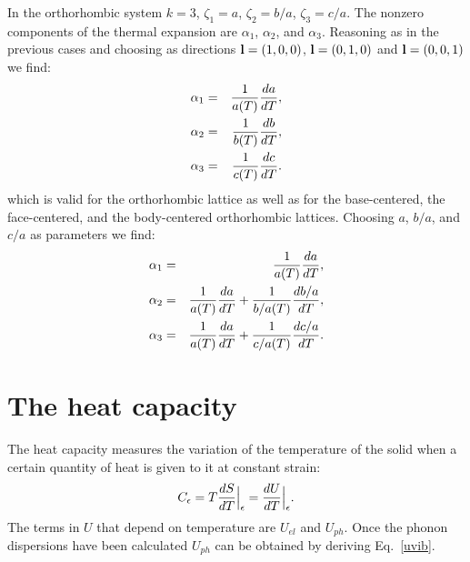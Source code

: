 \documentclass[12pt,a4paper,twoside]{report}
\begin{document}
In the orthorhombic system $k=3$, $\zeta_1=a$, $\zeta_2=b/a$, 
$\zeta_3=c/a$. The nonzero components of the thermal expansion are 
$\alpha_{1}$, $\alpha_{2}$, and $\alpha_{3}$. 
Reasoning as in the previous cases and choosing as directions
${\bf l}=(1,0,0)$, ${\bf l}=(0,1,0)$ and ${\bf l}=(0,0,1)$ we find:  
\begin{eqnarray}
\alpha_{1} &=&  {1\over a(T) } {d a \over dT}, \\ 
\alpha_{2} &=&  {1\over b(T) } {d b \over dT}, \\
\alpha_{3} &=&  {1\over c(T) } {d c \over dT}.
\end{eqnarray}
which is valid for the orthorhombic lattice as well as for the
base-centered, the face-centered, and the body-centered orthorhombic lattices.
Choosing $a$, $b/a$, and $c/a$ as parameters we find:
\begin{eqnarray}
\alpha_1 &=& {1\over a(T)} {d a \over dT}, \\
\alpha_2 &=& {1\over a(T)} {da \over d T}  + {1\over b/a(T)} {d b/a \over dT}, \\
\alpha_3 &=& {1\over a(T)} {da \over d T}  + {1\over c/a(T)} {d c/a \over dT}.
\end{eqnarray}



\newpage
{\color{dark-blue}\chapter{The heat capacity}}
\color{black}

The heat capacity measures the variation of the temperature of the solid
when a certain quantity of heat is given to it at constant strain:
\begin{equation}
C_\epsilon= T {d S \over dT}\Big|_\epsilon = { d U \over d T}\Big|_\epsilon.
\end{equation}
The terms in $U$ that depend on temperature are $U_{el}$ and $U_{ph}$. 
Once the phonon dispersions 
have been calculated $U_{ph}$ can be obtained by deriving Eq.~\ref{uvib}.
\end{document}
